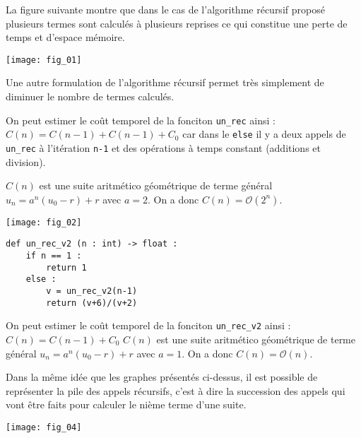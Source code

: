 La figure suivante montre que dans le cas de l'algorithme récursif proposé plusieurs termes sont calculés à plusieurs reprises ce qui constitue une perte de temps et d'espace mémoire. 

\begin{center}
\texttt{[image: fig\_01]}
\end{center}

Une autre formulation de l'algorithme récursif permet très simplement de diminuer le nombre de termes calculés. 

\begin{remarque}[  -- Complexité]
On peut estimer le coût temporel de la fonciton \lstinline{un_rec} ainsi :
$C(n)=C(n-1)+C(n-1)+C_0$ car dans le \lstinline{else} il y a deux appels de \lstinline{un_rec} à l'itération \lstinline{n-1} et des opérations à temps constant (additions et division).

$C(n)$ est une suite aritmético géométrique de terme général $u_n = a^n \left(u_0-r\right)+r$ avec 	$a =2$.
On a donc $C(n)=\mathcal{O}\left(2^n\right)$.

\end{remarque}



\begin{marginfigure}
\texttt{[image: fig\_02]}
\end{marginfigure}

\begin{lstlisting}
def un_rec_v2 (n : int) -> float :
    if n == 1 :
        return 1
    else : 
        v = un_rec_v2(n-1)
        return (v+6)/(v+2)
\end{lstlisting}

\begin{remarque}[  -- Complexité]
On peut estimer le coût temporel de la fonciton \lstinline{un_rec_v2} ainsi :
$C(n)=C(n-1)+C_0$ 
$C(n)$ est une suite aritmético géométrique de terme général $u_n = a^n \left(u_0-r\right)+r$ avec 	$a =1$.
On a donc $C(n)=\mathcal{O}\left(n\right)$.

\end{remarque}


Dans la même idée que les graphes présentés ci-dessus, il est possible de représenter la pile des appels récursifs, c'est à dire la succession des appels qui vont être faits pour calculer le nième terme d'une suite. 

\begin{center}
\texttt{[image: fig\_04]}
\end{center}

